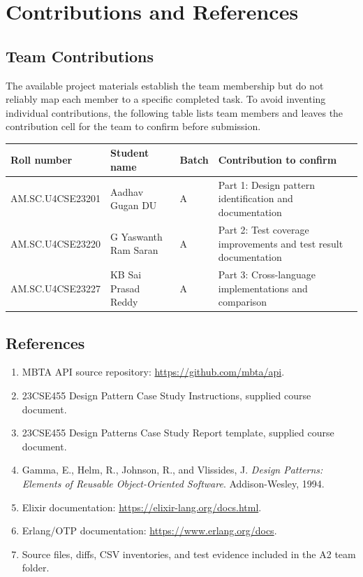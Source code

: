 \documentclass[11pt,a4paper]{article}
\begin{document}
\section{Contributions and References}
\subsection{Team Contributions}
The available project materials establish the team membership but do not reliably map each member to a specific completed task. To avoid inventing individual contributions, the following table lists team members and leaves the contribution cell for the team to confirm before submission.
\begin{tabularx}{\linewidth}{@{}lXlX@{}}
\toprule Roll number & Student name & Batch & Contribution to confirm\\ \midrule
AM.SC.U4CSE23201 & Aadhav Gugan DU & A & Part 1: Design pattern identification and documentation \\
AM.SC.U4CSE23220 & G Yaswanth Ram Saran & A & Part 2: Test coverage improvements and test result documentation \\
AM.SC.U4CSE23227 & KB Sai Prasad Reddy & A & Part 3: Cross-language implementations and comparison \\
\bottomrule
\end{tabularx}

\subsection{References}
\begin{enumerate}[leftmargin=*]
\item MBTA API source repository: \url{https://github.com/mbta/api}.
\item 23CSE455 Design Pattern Case Study Instructions, supplied course document.
\item 23CSE455 Design Patterns Case Study Report template, supplied course document.
\item Gamma, E., Helm, R., Johnson, R., and Vlissides, J. \textit{Design Patterns: Elements of Reusable Object-Oriented Software}. Addison-Wesley, 1994.
\item Elixir documentation: \url{https://elixir-lang.org/docs.html}.
\item Erlang/OTP documentation: \url{https://www.erlang.org/docs}.
\item Source files, diffs, CSV inventories, and test evidence included in the A2 team folder.
\end{enumerate}
\end{document}
